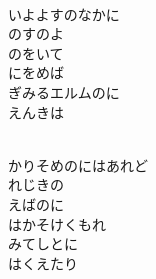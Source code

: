 \documentclass[10pt,b5j]{tarticle} %
\begin{document}
\begin{enumerate}
\begin{minipage}[c]{\blocksize}
    \end{minipage}
    \begin{minipage}[c]{\blocksize}
        
        \vspace{\linespace}
        \item~\\
        いよよすのなかに\\
        のすのよ\\
        のをいて\\
        にをめば\\
        ぎみるエルムのに\\
        えんきは
        
    \end{minipage}
    \begin{minipage}[c]{\blocksize}
        
        \vspace{\linespace}
        \item~\\
        かりそめのにはあれど\\
        れじきの\\
        えばのに\\
        はかそけくもれ\\
        みてしとに\\
        はくえたり
        
    \end{minipage}
    \begin{minipage}[c]{\blocksize}
        

\end{minipage}
\end{enumerate}
\end{document}
